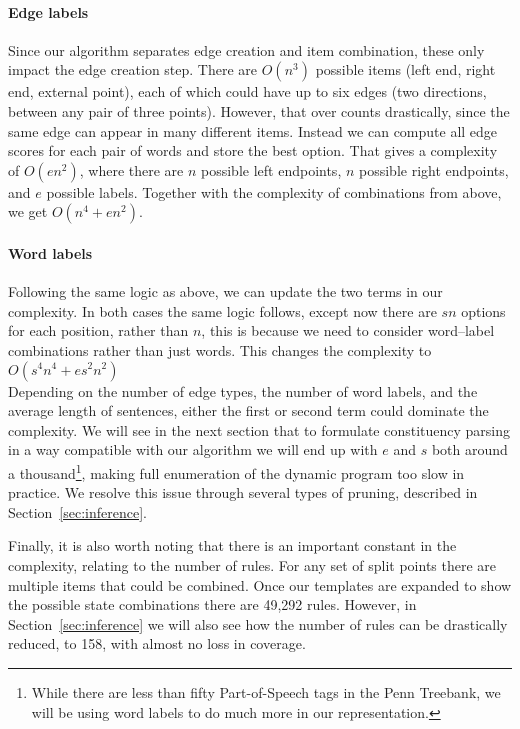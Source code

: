 \paragraph{Edge labels}
Since our algorithm separates edge creation and item combination, these only impact the edge creation step.
There are $O(n^3)$ possible items (left end, right end, external point), each of which could have up to six edges (two directions, between any pair of three points).
However, that over counts drastically, since the same edge can appear in many different items.
Instead we can compute all edge scores for each pair of words and store the best option.
That gives a complexity of $O(e n^2)$, where there are $n$ possible left endpoints, $n$ possible right endpoints, and $e$ possible labels.
Together with the complexity of combinations from above, we get $O(n^4 + e n^2)$.

\paragraph{Word labels}
Following the same logic as above, we can update the two terms in our complexity.
In both cases the same logic follows, except now there are $s n$ options for each position, rather than $n$, this is because we need to consider word--label combinations rather than just words.
This changes the complexity to $O(s^4 n^4 + e s^2 n^2)$ \\

Depending on the number of edge types, the number of word labels, and the average length of sentences, either the first or second term could dominate the complexity.
We will see in the next section that to formulate constituency parsing in a way compatible with our algorithm we will end up with $e$ and $s$ both around a thousand\footnote{
While there are less than fifty Part-of-Speech tags in the Penn Treebank, we will be using word labels to do much more in our representation.
}, making full enumeration of the dynamic program too slow in practice.
We resolve this issue through several types of pruning, described in Section~\ref{sec:inference}.

Finally, it is also worth noting that there is an important constant in the complexity, relating to the number of rules.
For any set of split points there are multiple items that could be combined.
Once our templates are expanded to show the possible state combinations there are 49,292 rules.
However, in Section~\ref{sec:inference} we will also see how the number of rules can be drastically reduced, to 158, with almost no loss in coverage.

